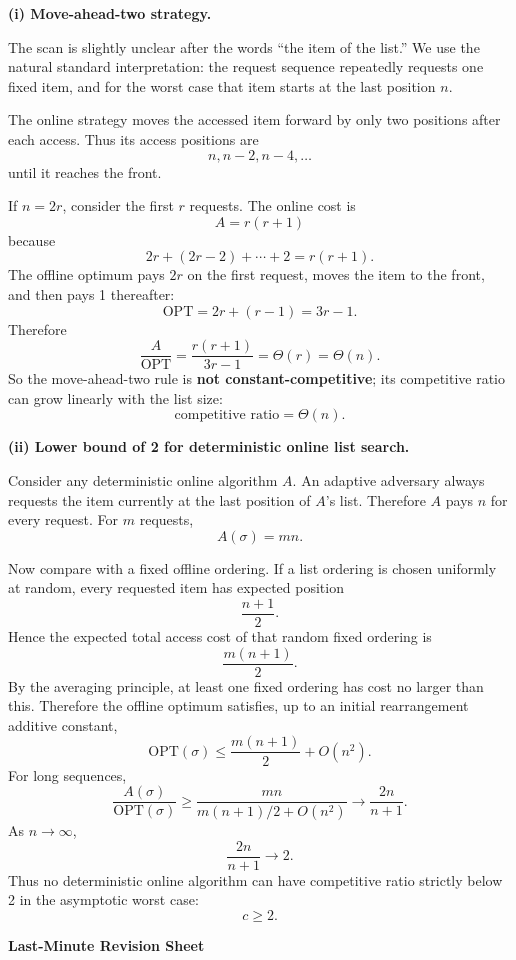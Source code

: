 \documentclass[11pt,a4paper]{article}
\newcommand{\OPT}{\mathrm{OPT}}
\begin{document}
\begin{qaanswer}[Answer 7(b)]
\textbf{(i) Move-ahead-two strategy.}

The scan is slightly unclear after the words ``the item of the list.'' We use the natural standard interpretation: the request sequence repeatedly requests one fixed item, and for the worst case that item starts at the last position \(n\).

The online strategy moves the accessed item forward by only two positions after each access. Thus its access positions are
\[
n,n-2,n-4,\ldots
\]
until it reaches the front.

If \(n=2r\), consider the first \(r\) requests. The online cost is
\[
A=r(r+1)
\]
because
\[
2r+(2r-2)+\cdots+2=r(r+1).
\]
The offline optimum pays \(2r\) on the first request, moves the item to the front, and then pays 1 thereafter:
\[
\OPT=2r+(r-1)=3r-1.
\]
Therefore
\[
\frac{A}{\OPT}
=\frac{r(r+1)}{3r-1}
=\Theta(r)=\Theta(n).
\]
So the move-ahead-two rule is \textbf{not constant-competitive}; its competitive ratio can grow linearly with the list size:
\[
\boxed{\text{competitive ratio}=\Theta(n).}
\]

\medskip
\textbf{(ii) Lower bound of 2 for deterministic online list search.}

Consider any deterministic online algorithm \(A\). An adaptive adversary always requests the item currently at the last position of \(A\)'s list. Therefore \(A\) pays \(n\) for every request. For \(m\) requests,
\[
A(\sigma)=mn.
\]

Now compare with a fixed offline ordering. If a list ordering is chosen uniformly at random, every requested item has expected position
\[
\frac{n+1}{2}.
\]
Hence the expected total access cost of that random fixed ordering is
\[
\frac{m(n+1)}{2}.
\]
By the averaging principle, at least one fixed ordering has cost no larger than this. Therefore the offline optimum satisfies, up to an initial rearrangement additive constant,
\[
\OPT(\sigma)\le\frac{m(n+1)}{2}+O(n^2).
\]
For long sequences,
\[
\frac{A(\sigma)}{\OPT(\sigma)}
\ge
\frac{mn}{m(n+1)/2+O(n^2)}
\longrightarrow
\frac{2n}{n+1}.
\]
As \(n\to\infty\),
\[
\frac{2n}{n+1}\to2.
\]
Thus no deterministic online algorithm can have competitive ratio strictly below 2 in the asymptotic worst case:
\[
\boxed{c\ge2.}
\]
\end{qaanswer}

\clearpage
\begin{center}
{\LARGE\bfseries\color{primary} Last-Minute Revision Sheet}
\end{center}
\end{document}
